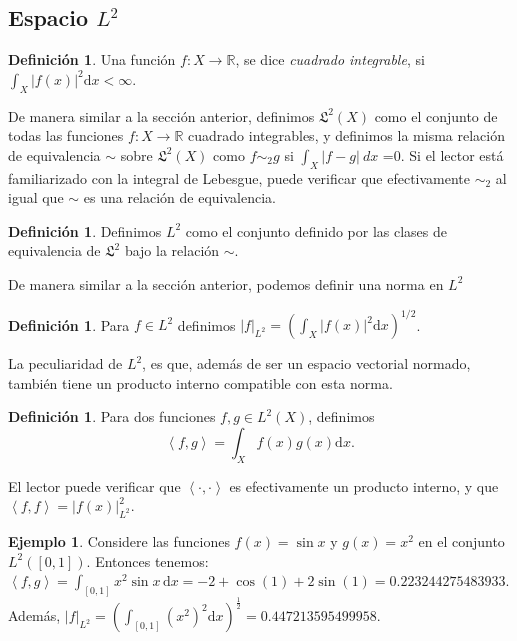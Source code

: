 \documentclass{article}
\theoremstyle{definition}
\newtheorem{defi}[thm]{Definición}
\newtheorem{exa}[thm]{Ejemplo}
\begin{document}
\subsection{Espacio $L^2$}%
\label{sub:EspacioL^2}

\begin{defi}
Una función  $f  \colon X \to \mathbb{R}$, se dice \textit{cuadrado
integrable}, si $ \int_{X}^{} |f(x)|^2 \text{d}x<\infty$.
\end{defi}

De manera similar a la sección anterior, definimos $\mathfrak{L}^2(X)$
como el conjunto de todas las funciones $ f \colon X \to \mathbb{R} $
cuadrado integrables, y definimos la misma relación de equivalencia $\sim$
sobre $\mathfrak{L}^2(X)$ como $f\sim_2 g$ si $\int_{{X}}^{{}} {|f-g|}
\: d{x} {}$ =0. Si el lector está familiarizado con la integral de
Lebesgue, puede verificar que efectivamente $\sim_2$ al igual que
$\sim$ es una relación de equivalencia.
\begin{defi}
Definimos $L^2$ como el conjunto definido por las clases de
equivalencia de $\mathfrak{L}^2$ bajo la relación $\sim$.
\end{defi}

De manera similar a la sección anterior, podemos definir una norma en $L^2$

\begin{defi}
Para $f \in L^2$ definimos $|f|_{L^2}={\left(\int_{X}^{} |f(x)|^2
\text{d}x\right)}^{1/2}$.
\end{defi}

La peculiaridad de $L^2$, es que, además de ser un espacio vectorial
normado, también tiene un producto interno compatible con esta norma.

\begin{defi}
Para dos funciones $f,g\in L^2(X)$, definimos 
\[
\left<f,g \right> =\int_{X}^{} f(x)g(x) \text{d}x.
\]
\end{defi}
El lector puede verificar que $\left< \cdot, \cdot \right>$ es
efectivamente un producto interno, y que $\left<f,f \right> =
|f(x)|_{L^2}^{{2}}$.

\begin{exa}
Considere las funciones $f(x)=\sin x$ y $g(x)=x^2$ en el conjunto
$L^2([0,1])$. Entonces tenemos: $\left< f , g \right> =
\int_{[0,1]}^{} x^2 \sin x \, \text{d}x=
 -2 + \cos{\left(1 \right)} + 2 \sin{\left(1
\right)}=0.223244275483933 $. Además, $|f|_{L^2}= \left(\int_{[0,1]}^{}
{\left(x^2\right)}^2 \text{d}x \right) ^{\frac{1}{2}}=
0.447213595499958$.
\end{exa}
\end{document}
